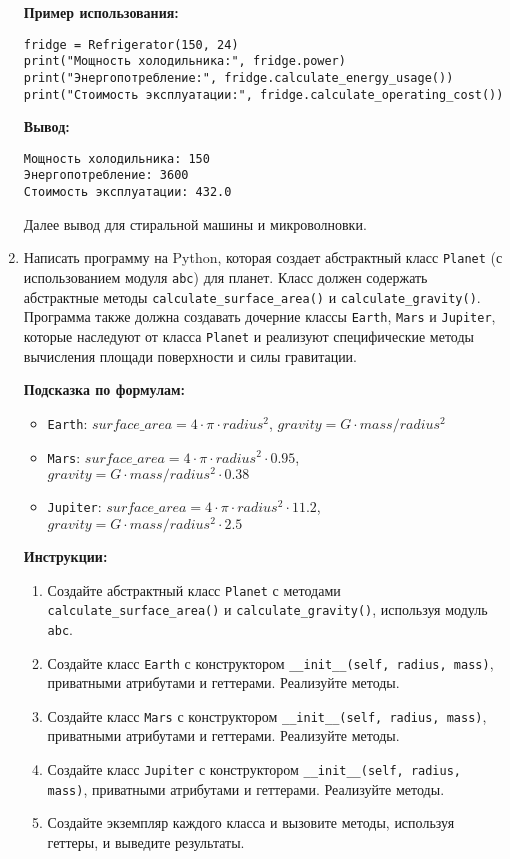 \begin{enumerate}
\textbf{Пример использования:}
\begin{verbatim}
fridge = Refrigerator(150, 24)
print("Мощность холодильника:", fridge.power)
print("Энергопотребление:", fridge.calculate_energy_usage())
print("Стоимость эксплуатации:", fridge.calculate_operating_cost())
\end{verbatim}

\textbf{Вывод:}
\begin{verbatim}
Мощность холодильника: 150
Энергопотребление: 3600
Стоимость эксплуатации: 432.0
\end{verbatim}

Далее вывод для стиральной машины и микроволновки.

\item
Написать программу на Python, которая создает абстрактный класс \texttt{Planet} (с использованием модуля \texttt{abc}) для планет. 
Класс должен содержать абстрактные методы \texttt{calculate\_surface\_area()} и \texttt{calculate\_gravity()}. 
Программа также должна создавать дочерние классы \texttt{Earth}, \texttt{Mars} и \texttt{Jupiter}, 
которые наследуют от класса \texttt{Planet} и реализуют специфические методы вычисления площади поверхности и силы гравитации.

\textbf{Подсказка по формулам:}
\begin{itemize}
    \item \texttt{Earth}: $surface\_area = 4 \cdot \pi \cdot radius^2$, $gravity = G \cdot mass / radius^2$
    \item \texttt{Mars}: $surface\_area = 4 \cdot \pi \cdot radius^2 \cdot 0.95$, $gravity = G \cdot mass / radius^2 \cdot 0.38$
    \item \texttt{Jupiter}: $surface\_area = 4 \cdot \pi \cdot radius^2 \cdot 11.2$, $gravity = G \cdot mass / radius^2 \cdot 2.5$
\end{itemize}

\textbf{Инструкции:}
\begin{enumerate}
    \item Создайте абстрактный класс \texttt{Planet} с методами \texttt{calculate\_surface\_area()} и \texttt{calculate\_gravity()}, используя модуль \texttt{abc}.
    \item Создайте класс \texttt{Earth} с конструктором \texttt{\_\_init\_\_(self, radius, mass)}, приватными атрибутами и геттерами. Реализуйте методы.
    \item Создайте класс \texttt{Mars} с конструктором \texttt{\_\_init\_\_(self, radius, mass)}, приватными атрибутами и геттерами. Реализуйте методы.
    \item Создайте класс \texttt{Jupiter} с конструктором \texttt{\_\_init\_\_(self, radius, mass)}, приватными атрибутами и геттерами. Реализуйте методы.
    \item Создайте экземпляр каждого класса и вызовите методы, используя геттеры, и выведите результаты.
\end{enumerate}


\end{enumerate}
